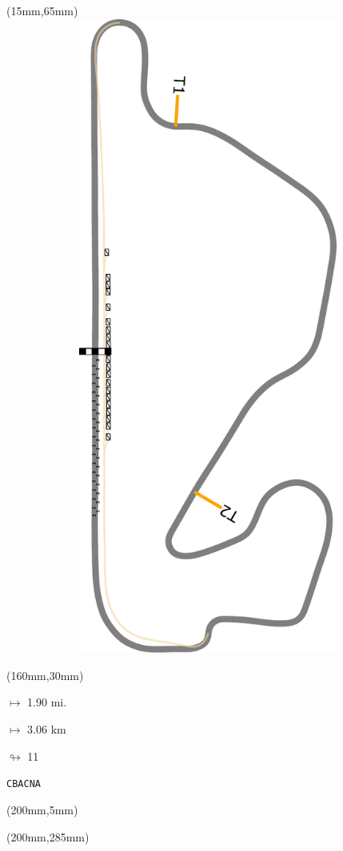 \begin{textblock*}{185mm}(15mm,65mm)%
\centering
\mbox{\includegraphics[width=185mm,height=210mm,keepaspectratio]{PT/CBACNA.pdf}}
\end{textblock*}
\begin{textblock*}{40mm}(160mm,30mm)%
\Large
\par$\mapsto$ 1.90 mi.
\par$\mapsto$ 3.06 km
\par$\looparrowright$ 11
\par\hfill\tiny\tt CBACNA\\
\end{textblock*}
\begin{textblock*}{20mm}(200mm,5mm)%
\fbox{\thepage}
\label{CBACNA}
\end{textblock*}
\begin{textblock*}{20mm}(200mm,285mm)%
\fbox{\thepage}
\end{textblock*}

